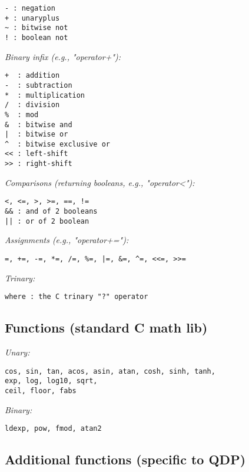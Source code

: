 \documentclass[12pt,letterpaper]{article}
\begin{document}
\begin{verbatim}
- : negation
+ : unaryplus
~ : bitwise not
! : boolean not
\end{verbatim}

\noindent
{\em Binary infix (e.g., "operator+"):}

\begin{verbatim}
+  : addition
-  : subtraction
*  : multiplication
/  : division
%  : mod
&  : bitwise and
|  : bitwise or
^  : bitwise exclusive or
<< : left-shift
>> : right-shift
\end{verbatim}

\noindent
{\em Comparisons (returning booleans, e.g., "operator<"):}

\begin{verbatim}
<, <=, >, >=, ==, !=
&& : and of 2 booleans
|| : or of 2 boolean
\end{verbatim}


\noindent
{\em Assignments (e.g., "operator+="):}

\begin{verbatim}
=, +=, -=, *=, /=, %=, |=, &=, ^=, <<=, >>=
\end{verbatim}

\noindent
{\em Trinary:}

\begin{verbatim}
where : the C trinary "?" operator
\end{verbatim}

\medskip


\subsection{Functions (standard C math lib)}
\label{sec:cfuncs}

\noindent
{\em Unary:}

\begin{verbatim}
cos, sin, tan, acos, asin, atan, cosh, sinh, tanh,
exp, log, log10, sqrt,
ceil, floor, fabs
\end{verbatim}

\noindent
{\em Binary:}

\begin{verbatim}
ldexp, pow, fmod, atan2
\end{verbatim}

\medskip


\subsection{Additional functions (specific to QDP)}
\label{sec:funcs}
\end{document}
